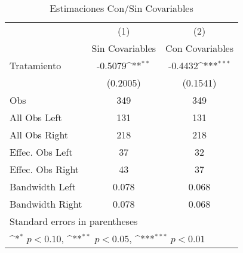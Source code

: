 \begin{table}[H]\centering            \begin{threeparttable} \def\sym#1{\ifmmode^{#1}\else\(^{#1}\)\fi}            \caption{Estimaciones Con/Sin Covariables}
\label{comparacion cut off}
\begin{tabular}{l*{2}c}
\hline
\hline
            &\multicolumn{1}{c}{(1)}&\multicolumn{1}{c}{(2)}\\
            &\multicolumn{1}{c}{Sin Covariables}&\multicolumn{1}{c}{Con Covariables}\\
\hline
Tratamiento &     -0.5079\sym{**} &     -0.4432\sym{***}\\
            &    (0.2005)         &    (0.1541)         \\
\hline
Obs         &         349         &         349         \\
All Obs Left&         131         &         131         \\
All Obs Right&         218         &         218         \\
Effec. Obs Left&          37         &          32         \\
Effec. Obs Right&          43         &          37         \\
Bandwidth Left&       0.078         &       0.068         \\
Bandwidth Right&       0.078         &       0.068         \\
\hline
\hline
\multicolumn{4}{l}{\footnotesize Standard errors in parentheses}\\
\multicolumn{3}{l}{\footnotesize \sym{*} \(p<0.10\), \sym{**} \(p<0.05\), \sym{***} \(p<0.01\)}\\
\end{tabular}
\begin{tablenotes}
\begin{footnotesize}
\end{footnotesize}
\end{tablenotes} \end{threeparttable} \end{table}
